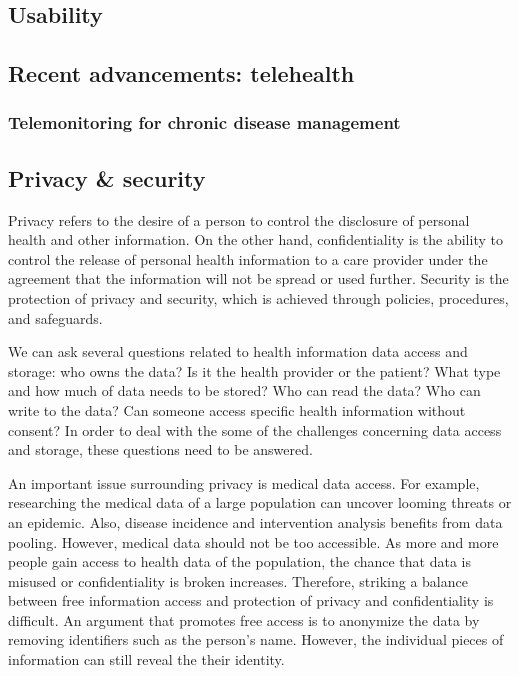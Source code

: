     \subsection{Usability}\label{usability}



    \subsection{Recent advancements: telehealth}\label{telehealth}

        \subsubsection{Telemonitoring for chronic disease management}



    \subsection{Privacy \& security}\label{privacy}

    Privacy refers to the desire of a person to control the disclosure of personal health and other information\cite{Shortliffe2014}. On the other hand, confidentiality is the ability to control the release of personal health information to a care provider under the agreement that the information will not be spread or used further. Security is the protection of privacy and security, which is achieved through policies, procedures, and safeguards. 

    We can ask several questions related to health information data access and storage: who owns the data? Is it the health provider or the patient? What type and how much of data needs to be stored? Who can read the data? Who can write to the data? Can someone access specific health information without consent? In order to deal with the some of the challenges concerning data access and storage, these questions need to be answered\cite{Meingast2006}.

    An important issue surrounding privacy is medical data access. For example, researching the medical data of a large population can uncover looming threats or an epidemic. Also, disease incidence and intervention analysis benefits from data pooling. However, medical data should not be too accessible. As more and more people gain access to health data of the population, the chance that data is misused or confidentiality is broken increases. Therefore, striking a balance between free information access and protection of privacy and confidentiality is difficult. An argument that promotes free access is to anonymize the data by removing identifiers such as the person's name. However, the individual pieces of information can still reveal the their identity.

